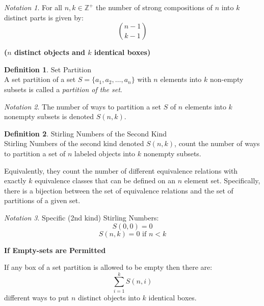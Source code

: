 \documentclass[10pt,a4paper,titlepage,twoside,draft]{article}
\theoremstyle{plain}
\theoremstyle{definition}
\newtheorem{defn}{Definition}
\theoremstyle{remark}
\newtheorem{nota}{Notation}
\begin{document}
\medskip

\begin{nota}
For all $n,k \in \mathbb{Z}^{+}$ the number of strong compositions of $n$ into $k$ distinct parts is given by:
\[ \binom{n-1}{k-1} \]
\end{nota}

\bigskip

\textbf{($n$ distinct objects and $k$ identical boxes)} \\

\medskip

\begin{defn}{Set Partition} \\
A set partition of a set $S = \{a_{1}, a_{2}, \ldots, a_{n} \}$ with $n$ elements into $k$ non-empty subsets is called a \emph{partition of the set}.
\end{defn}

\medskip

\begin{nota}
The number of ways to partition a set $S$ of $n$ elements into $k$ nonempty subsets is denoted $S(n,k)$. 
\end{nota}

\medskip

\begin{defn}{Stirling Numbers of the Second Kind} \\
Stirling Numbers of the second kind denoted $S(n,k)$, count the number of ways to partition a set of $n$ labeled objects into $k$ nonempty subsets. 
\end{defn}

\medskip


Equivalently, they count the number of different equivalence relations with exactly $k$ equivalence classes that can be defined on an $n$ element set. 
Specifically, there is a bijection between the set of equivalence relations and the set of partitions of a given set. 


\medskip

\begin{nota}
Specific (2nd kind) Stirling Numbers: \\
\[ S(0,0) = 0 \]
\[S(n,k) = 0 \text{ if } n < k \]
\end{nota}

\medskip

\textbf{If Empty-sets are Permitted} \\

\medskip

If any box of a set partition is allowed to be empty then there are:
\[ \sum_{i=1}^{k} S(n,i) \]
different ways to put $n$ distinct objects into $k$ identical boxes. 
\end{document}
